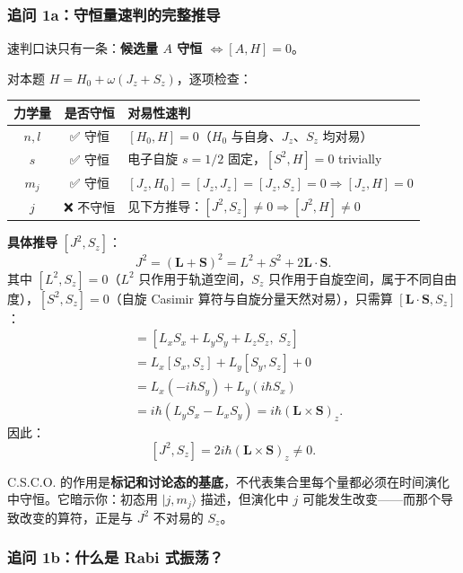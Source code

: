 \subsubsection*{追问 1a：守恒量速判的完整推导}

速判口诀只有一条：\textbf{候选量 $A$ 守恒 $\Leftrightarrow [A, H] = 0$}。

对本题 $H = H_0 + \omega(J_z + S_z)$，逐项检查：

\begin{center}
\renewcommand{\arraystretch}{1.4}
\begin{tabular}{|c|c|l|}
\hline
\textbf{力学量} & \textbf{是否守恒} & \textbf{对易性速判} \\
\hline
$n, l$ & ✅ 守恒 & $[H_0, H]=0$（$H_0$ 与自身、$J_z$、$S_z$ 均对易） \\
\hline
$s$ & ✅ 守恒 & 电子自旋 $s=1/2$ 固定，$[S^2, H]=0$ trivially \\
\hline
$m_j$ & ✅ 守恒 & $[J_z, H_0]=[J_z, J_z]=[J_z, S_z]=0 \Rightarrow [J_z, H]=0$ \\
\hline
$j$ & ❌ 不守恒 & 见下方推导：$[J^2, S_z] \neq 0 \Rightarrow [J^2, H] \neq 0$ \\
\hline
\end{tabular}
\end{center}

\textbf{具体推导} $[J^2, S_z]$：
\[
J^2 = (\bm{L}+\bm{S})^2 = L^2 + S^2 + 2\bm{L}\cdot\bm{S}.
\]
其中 $[L^2, S_z]=0$（$L^2$ 只作用于轨道空间，$S_z$ 只作用于自旋空间，属于不同自由度），$[S^2, S_z]=0$（自旋 Casimir 算符与自旋分量天然对易），只需算 $[\bm{L}\cdot\bm{S}, S_z]$：
\begin{align*}
[\bm{L}\cdot\bm{S}, S_z] &= [L_x S_x + L_y S_y + L_z S_z,\; S_z] \\
&= L_x [S_x, S_z] + L_y [S_y, S_z] + 0 \\
&= L_x (-i\hbar S_y) + L_y (i\hbar S_x) \\
&= i\hbar (L_y S_x - L_x S_y) = i\hbar (\bm{L}\times\bm{S})_z.
\end{align*}
因此：
\[
[J^2, S_z] = 2i\hbar (\bm{L}\times\bm{S})_z \neq 0.
\]

\begin{tipbox}
C.S.C.O. 的作用是\textbf{标记和讨论态的基底}，不代表集合里每个量都必须在时间演化中守恒。它暗示你：初态用 $|j, m_j\rangle$ 描述，但演化中 $j$ 可能发生改变——而那个导致改变的算符，正是与 $J^2$ 不对易的 $S_z$。
\end{tipbox}

\subsubsection*{追问 1b：什么是 Rabi 式振荡？}

